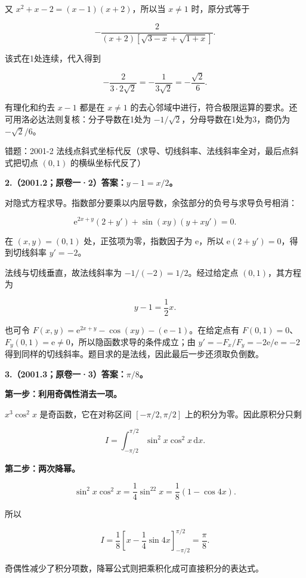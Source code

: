 \documentclass[UTF8,11pt,fontset=windows]{ctexart}
\begin{document}
又 $x^2+x-2=(x-1)(x+2)$，所以当 $x\ne1$ 时，原分式等于

$$
-\frac2{(x+2)[\sqrt{3-x}+\sqrt{1+x}]}.
$$

该式在1处连续，代入得到

$$
-\frac2{3\cdot2\sqrt2}=-\frac1{3\sqrt2}=-\frac{\sqrt2}{6}.
$$

有理化和约去 $x-1$ 都是在 $x\ne1$ 的去心邻域中进行，符合极限运算的要求。还可用洛必达法则复核：分子导数在1处为 $-1/\sqrt2$，分母导数在1处为3，商仍为 $-\sqrt2/6$。

\begingroup\color{gray}错题：2001-2 法线点斜式坐标代反（求导、切线斜率、法线斜率全对，最后点斜式把切点 $(0,1)$ 的横纵坐标代反了）\par\endgroup

\clearpage

\textbf{2.（2001.2；原卷一·2）答案：$y-1=x/2$。}

对隐式方程求导。指数部分要乘以内层导数，余弦部分的负号与求导负号相消：

$$
\mathrm e^{2x+y}(2+y')+\sin(xy)(y+xy')=0.
$$

在 $(x,y)=(0,1)$ 处，正弦项为零，指数因子为 $\mathrm e$，所以 $\mathrm e(2+y')=0$，得到切线斜率 $y'=-2$。

法线与切线垂直，故法线斜率为 $-1/(-2)=1/2$。经过给定点 $(0,1)$，其方程为

$$
y-1=\frac12x.
$$

也可令 $F(x,y)=\mathrm e^{2x+y}-\cos(xy)-(\mathrm e-1)$。在给定点有 $F(0,1)=0$、$F_y(0,1)=\mathrm e\ne0$，所以隐函数求导的条件成立；由 $y'=-F_x/F_y=-2\mathrm e/\mathrm e=-2$ 得到同样的切线斜率。题目求的是法线，因此最后一步还须取负倒数。

\clearpage

\textbf{3.（2001.3；原卷一·3）答案：$\pi/8$。}

\textbf{第一步：利用奇偶性消去一项。}

$x^3\cos^2x$ 是奇函数，它在对称区间 $[-\pi/2,\pi/2]$ 上的积分为零。因此原积分只剩

$$
I=\int_{-\pi/2}^{\pi/2}\sin^2x\cos^2x\,\mathrm dx.
$$

\textbf{第二步：两次降幂。}

$$
\sin^2x\cos^2x=\frac14\sin^22x=\frac18(1-\cos4x).
$$

所以

$$
I=\frac18\left[x-\frac14\sin4x\right]_{-\pi/2}^{\pi/2}=\frac\pi8.
$$

奇偶性减少了积分项数，降幂公式则把乘积化成可直接积分的表达式。
\end{document}
